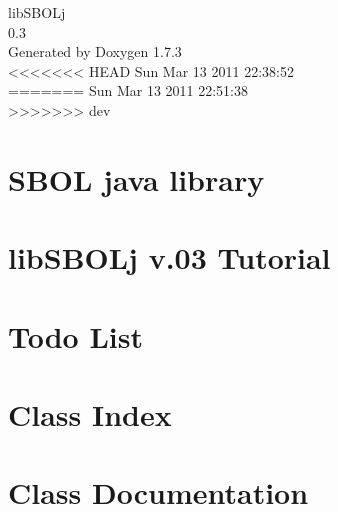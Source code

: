 \documentclass[a4paper]{book}
\begin{document}
\hypersetup{pageanchor=false}
\begin{titlepage}
\vspace*{7cm}
\begin{center}
{\Large libSBOLj \\[1ex]\large 0.3 }\\
\vspace*{1cm}
{\large Generated by Doxygen 1.7.3}\\
\vspace*{0.5cm}
<<<<<<< HEAD
{\small Sun Mar 13 2011 22:38:52}\\
=======
{\small Sun Mar 13 2011 22:51:38}\\
>>>>>>> dev
\end{center}
\end{titlepage}
\clearemptydoublepage
{}
\tableofcontents
\clearemptydoublepage
{}
\hypersetup{pageanchor=true}
\chapter{SBOL java library}
\label{index}\hypertarget{index}{}
\chapter{libSBOLj v.03 Tutorial}
\label{tutorial}
\hypertarget{tutorial}{}

\chapter{Todo List}
\label{todo}
\hypertarget{todo}{}

\chapter{Class Index}

\chapter{Class Documentation}














\printindex
\end{document}
